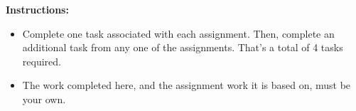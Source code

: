 {\bf Instructions:}

\begin{itemize}

\item Complete one task associated with each assignment.  Then, complete an additional
  task from any one of the assignments.  That's a total of 4 tasks required.

\item The work completed here, and the assignment work it is based on, must be your own.

\end{itemize}
